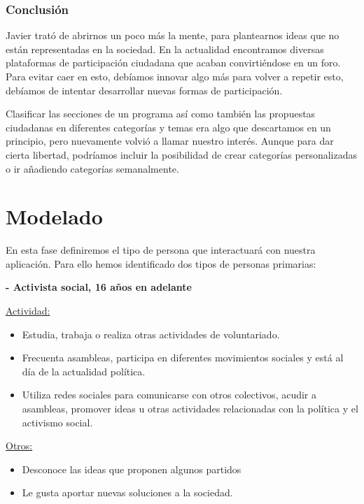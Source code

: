 \subsubsection{Conclusión}

Javier trató de abrirnos un poco más la mente, para plantearnos ideas que no están representadas en la sociedad. En la actualidad encontramos diversas plataformas de participación ciudadana que acaban convirtiéndose en un foro. Para evitar caer en esto, debíamos innovar algo más para volver a repetir esto, debíamos de intentar desarrollar nuevas formas de participación.

Clasificar las secciones de un programa así como también las propuestas ciudadanas en diferentes categorías y temas era algo que descartamos en un principio, pero nuevamente volvió a llamar nuestro interés. Aunque para dar cierta libertad, podríamos incluir la posibilidad de crear categorías personalizadas o ir añadiendo categorías semanalmente.

\section{Modelado}

En esta fase definiremos el tipo de persona que interactuará con nuestra aplicación. Para ello hemos identificado dos tipos de personas primarias:

\textbf{- Activista social, 16 años en adelante}

\underline{Actividad:}

\begin{itemize}
\item Estudia, trabaja o realiza otras actividades de voluntariado.
\item Frecuenta asambleas, participa en diferentes movimientos sociales y está al día de la actualidad política.
\item Utiliza redes sociales para comunicarse con otros colectivos, acudir a asambleas, promover ideas u otras actividades relacionadas con la política y el activismo social.
\end{itemize}

\underline{Otros:}

\begin{itemize}
\item Desconoce las ideas que proponen algunos partidos 
\item Le gusta aportar nuevas soluciones a la sociedad.
\end{itemize}

